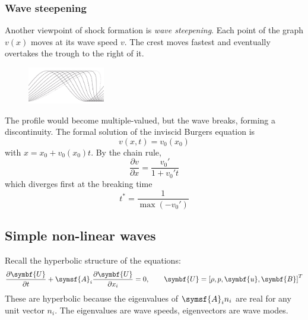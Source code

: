 \documentclass{jknotes}
\newcommand{\B}{\symbf{B}}
\renewcommand{\u}{\symbf{u}}
\begin{document}
\subsubsection{Wave steepening}
Another viewpoint of shock formation is \emph{wave steepening}. Each point of
the graph $v(x)$ moves at its wave speed $v$. The crest moves fastest and
eventually overtakes the trough to the right of it. 
\begin{figure}[h]
	\centering
	\includegraphics[width=0.3\textwidth]{steepening.png}
\end{figure}
The profile would become multiple-valued, but the wave breaks, forming a
discontinuity. The formal solution of the inviscid Burgers equation is
\begin{equation}
	v(x,t) = v_0(x_0)
\end{equation}
with $x = x_0 + v_0(x_0) t$. By the chain rule,
\begin{equation}
	\frac{\partial v}{\partial x} = \frac{v_0'}{1+v_0' t}
\end{equation}
which diverges first at the breaking time
\begin{equation}
	t^* = \frac{1}{\max(-v_0')}
\end{equation}

\subsection{Simple non-linear waves}
Recall the hyperbolic structure of the equations:
\begin{equation}
	\frac{\partial \symbf{U}}{\partial t} + \symsf{A}_i \frac{\partial
	\symbf{U}}{\partial x_i} = 0, \hspace{2em} \symbf{U} = \left[ \rho, p, \u,
	\B\right]^T
\end{equation}
These are hyperbolic because the eigenvalues of $\symsf{A}_i n_i$ are real for
any unit vector $n_i$. The eigenvalues are wave speeds, eigenvectors are
wave modes.
\end{document}
